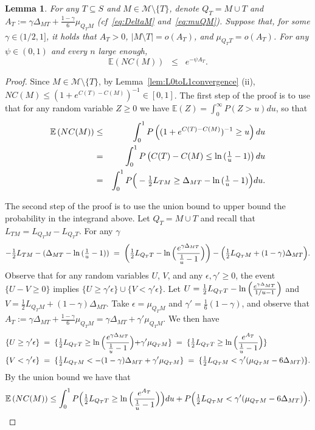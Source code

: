 \documentclass[10pt,a4paper]{amsart}
\newtheorem{lem}{Lemma}
\newcommand{\E}{\mathbb{E}}
\newcommand{\M}{\mathcal{M}}
\begin{document}
\begin{lem}\label{lem:boundexpnc} For any $T\subseteq S$ and $M\in \M\setminus\{T\}$, denote $Q_T= M\cup T$ and $A_T:=\gamma\Delta_{MT}+\tfrac{1-\gamma}{6}\mu_{Q_TM}$ (\emph{cf}~\eqref{eq:DeltaM} and~\eqref{eq:muQM}). Suppose that, for some $\gamma \in (1/2,1]$, it holds that $A_T>0$, $|M\setminus T|=o(A_T)$, and $\mu_{Q_T T}=o(A_T)$. For any $\psi\in(0,1)$ and every $n$ large enough,
$$\E\left(NC(M)\right)  \;\;\leq\;\; e^{-\psi A_T}.$$
\end{lem}

\begin{proof}
Since $M\in \mathcal M\setminus \{T\}$, by Lemma~\ref{lem:L0toL1convergence} (ii),  $NC(M)\leq (1+e^{C(T)-C(M)})^{-1} \in [0,1]$.  
The first step of the proof is to use that for any random variable $Z \geq 0$ we have $\E(Z)=\int_0^\infty P(Z>u) du$, so that
\begin{eqnarray*}
  \E\left(NC(M)\right)  &\leq& \int_0^1 P\left((1+e^{C(T)-C(M)})^{-1}\geq u\right){\rm d} u\\
  &=&\int_0^1 P\left(C(T)-C(M) \leq \ln{(\tfrac1u-1)}\right){\rm d}u\\
  &=&\int_0^1 P\Big(-\tfrac12 L_{TM} \geq \Delta_{MT}-\ln{(\tfrac1u-1)}\Big) {\rm d}u.
\end{eqnarray*}

The second step of the proof is to use the union bound to upper bound the probability in the integrand above.
Let $Q_T=M \cup T$ and recall that $L_{TM}=L_{Q_TM}-L_{Q_TT}$. For any $\gamma$ 
$$
-\tfrac12 L_{TM} -(\Delta_{MT}-\ln{(\tfrac1u-1)})\;=\;\left(\tfrac12 L_{Q_TT}-\ln{\Bigl(\frac{e^{\gamma\Delta_{MT}}}{\tfrac1u-1}\Bigl)}\right)-\Bigl(\tfrac12 L_{Q_TM}+(1-\gamma)\Delta_{MT}\Bigl).
$$
Observe that for any random variables $U$, $V$, and any $\epsilon,\gamma' \geq 0$, the event $
\{U-V \geq 0\}$ implies $\{U \geq \gamma' \epsilon\}\cup
\{V  < \gamma' \epsilon\}$. Let $U=\tfrac12 L_{Q_TT}-\ln{\Bigl(\frac{e^{\gamma\Delta_{MT}}}{1/u-1}\Bigl)}$ and $V=\tfrac12 L_{Q_TM}+(1-\gamma)\Delta_{MT}$. Take $\epsilon=\mu_{Q_TM}$ and $\gamma'=\tfrac16({1-\gamma})$, and observe that
$A_T:=\gamma\Delta_{MT}+\tfrac{1-\gamma}{6}\mu_{Q_TM}= \gamma\Delta_{MT}+\gamma'\mu_{Q_TM}$. We then have
\begin{align*}
\{U\geq \gamma'\epsilon\}\;&=\;\{\tfrac12 L_{Q_TT}\geq \ln{\Bigl(\frac{e^{\gamma\Delta_{MT}}}{\tfrac1u-1}}\Bigl)+\gamma'\mu_{Q_TM}\}\;=\;\{\tfrac12 L_{Q_TT}\geq \ln{\Bigl(\frac{e^{A_T}}{\tfrac1u-1}}\Bigl)\}\\
\{V<\gamma'\epsilon\}\;&=\;\{\tfrac12 L_{Q_TM}<-(1-\gamma)\Delta_{MT}+\gamma'\mu_{Q_TM}\}\;=\;\{\tfrac12 L_{Q_TM}<\gamma'(\mu_{Q_TM}-6\Delta_{MT})\}.
\end{align*}
By the union bound we have that
\begin{equation}\label{eq:prooflemmas20nonspu}
    \E\left(NC(M)\right)  \leq \int_0^1P\Bigl(\tfrac12 L_{Q_TT}\geq \ln{\Bigl(\frac{e^{A_T}}{\tfrac1u-1}\Bigl)}\Bigl){\rm d}u+ P\Bigl(\tfrac12 L_{Q_TM}<\gamma'(\mu_{Q_TM}-6\Delta_{MT})\Bigl).
\end{equation}


\end{proof}
\end{document}

